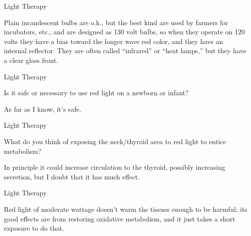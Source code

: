 \documentclass[11pt,oneside,openany,extrafontsizes]{memoir}
\begin{document}
\begin{standalonequote}{Light Therapy}

    \begin{answer}
        Plain incandescent bulbs are o.k., but the best kind are used by farmers for incubators, etc., and are designed as 130 volt bulbs, so when they operate on 120 volts they have a bias toward the longer wave red color, and they have an internal reflector. They are often called \enquote{infrared} or \enquote{heat lamps,} but they have a clear glass front.
    \end{answer}
\end{standalonequote}

\begin{qaexchange}{Light Therapy}

    \begin{question}
        Is it safe or necessary to use red light on a newborn or infant?
    \end{question}

    \begin{answer}
        As far as I know, it's safe.
    \end{answer}
\end{qaexchange}

\begin{qaexchange}{Light Therapy}

    \begin{question}
        What do you think of exposing the neck/thyroid area to red light to entice metabolism?
    \end{question}

    \begin{answer}
      In principle it could increase circulation to the thyroid, possibly increasing secretion, but I doubt that it has much effect.
    \end{answer}
\end{qaexchange}

\begin{standalonequote}{Light Therapy}

    \begin{answer}
      Red light of moderate wattage doesn't warm the tissues enough to be harmful; its good effects are from restoring oxidative metabolism, and it just takes a short exposure to do that.
    \end{answer}
\end{standalonequote}
\end{document}
